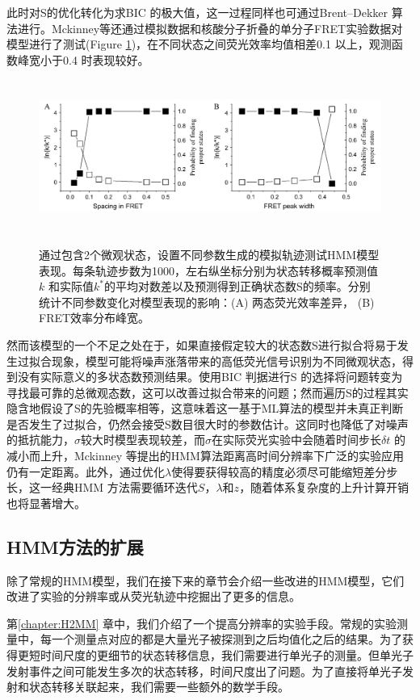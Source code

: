 \documentclass[11pt, a4paper]{article}
\begin{document}
此时对S的优化转化为求BIC 的极大值，这一过程同样也可通过Brent–Dekker 算法进行。Mckinney等还通过模拟数据和核酸分子折叠的单分子FRET实验数据对模型进行了测试(Figure \ref{fig:test})，在不同状态之间荧光效率均值相差0.1 以上，观测函数峰宽小于0.4 时表现较好。

\begin{figure}[htb]
  \centering
  \includegraphics[height=5cm]{Fig_test.PNG}\\
  \caption{通过包含2个微观状态，设置不同参数生成的模拟轨迹测试HMM模型表现。每条轨迹步数为1000，左右纵坐标分别为状态转移概率预测值$k$ 和实际值$k^*$的平均对数差以及预测得到正确状态数S的频率。分别统计不同参数变化对模型表现的影响：(A) 两态荧光效率差异， (B) FRET效率分布峰宽。}%
  \label{fig:test}
\end{figure}

然而该模型的一个不足之处在于，如果直接假定较大的状态数S进行拟合将易于发生过拟合现象，模型可能将噪声涨落带来的高低荧光信号识别为不同微观状态，得到没有实际意义的多状态数预测结果。使用BIC 判据进行S 的选择将问题转变为寻找最可靠的总微观态数，这可以改善过拟合带来的问题；然而遍历S的过程其实隐含地假设了S的先验概率相等，这意味着这一基于ML算法的模型并未真正判断是否发生了过拟合，仍然会接受S数目很大时的参数估计。这同时也降低了对噪声的抵抗能力，$\sigma$较大时模型表现较差，而$\sigma$在实际荧光实验中会随着时间步长$\delta t$ 的减小而上升，Mckinney 等提出的HMM算法距离高时间分辨率下广泛的实验应用仍有一定距离。此外，通过优化$\lambda$使得要获得较高的精度必须尽可能缩短差分步长，这一经典HMM 方法需要循环迭代$S$，$\lambda$和$z$，随着体系复杂度的上升计算开销也将显著增大。


\subsection{HMM方法的扩展}
除了常规的HMM模型，我们在接下来的章节会介绍一些改进的HMM模型，它们改进了实验的分辨率或从荧光轨迹中挖掘出了更多的信息。

第\ref{chapter:H2MM} 章中，我们介绍了一个提高分辨率的实验手段。常规的实验测量中，每一个测量点对应的都是大量光子被探测到之后均值化之后的结果。为了获得更短时间尺度的更细节的状态转移信息，我们需要进行单光子的测量。但单光子发射事件之间可能发生多次的状态转移，时间尺度出了问题。为了直接将单光子发射和状态转移关联起来，我们需要一些额外的数学手段。
\end{document}
